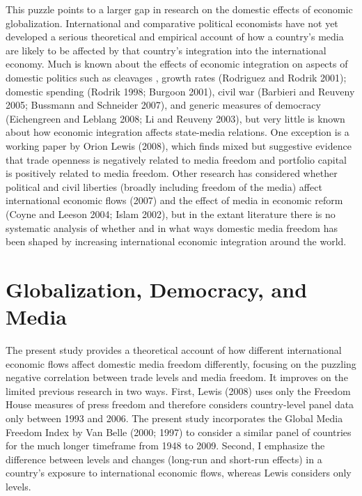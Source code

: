 \documentclass[a4paper]{article}\usepackage[]{graphicx}\usepackage[]{color}
\begin{document}
This puzzle points to a larger gap in research on the domestic effects of economic globalization. International and comparative political economists have not yet developed a serious theoretical and empirical account of how a country's media are likely to be affected by that country's integration into the international economy. Much is known about the effects of economic integration on aspects of domestic politics such as cleavages \parencites{Rogowski:1987ip}{Rogowski:1989wm}{Hiscox:2002us}{hiscox2002international}, growth rates (Rodriguez and Rodrik 2001); domestic spending (Rodrik 1998; Burgoon 2001), civil war (Barbieri and Reuveny 2005; Bussmann and Schneider 2007), and generic measures of democracy (Eichengreen and Leblang 2008; Li and Reuveny 2003), but very little is known about how economic integration affects state-media relations. One exception is a working paper by Orion Lewis (2008), which finds mixed but suggestive evidence that trade openness is negatively related to media freedom and portfolio capital is positively related to media freedom. Other research has considered whether political and civil liberties (broadly including freedom of the media) affect international economic flows (2007) and the effect of media in economic reform (Coyne and Leeson 2004; Islam 2002), but in the extant literature there is no systematic analysis of whether and in what ways domestic media freedom has been shaped by increasing international economic integration around the world.

\section{Globalization, Democracy, and Media}

The present study provides a theoretical account of how different international economic flows affect domestic media freedom differently, focusing on the puzzling negative correlation between trade levels and media freedom. It improves on the limited previous research in two ways. First, Lewis (2008) uses only the Freedom House measures of press freedom and therefore considers country-level panel data only between 1993 and 2006. The present study incorporates the Global Media Freedom Index by Van Belle (2000; 1997) to consider a similar panel of countries for the much longer timeframe from 1948 to 2009. Second, I emphasize the difference between levels and changes (long-run and short-run effects) in a country's exposure to international economic flows, whereas Lewis considers only levels.
\end{document}
